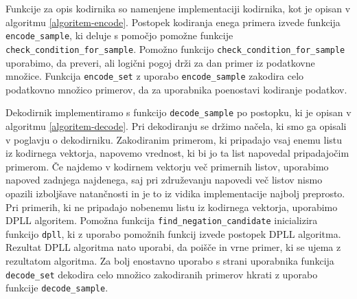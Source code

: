\documentclass[12pt,a4paper,twoside]{article}
\theoremstyle{definition} %
\theoremstyle{plain} %
\numberwithin{equation}{section}  %
\begin{document}
Funkcije za opis kodirnika so namenjene implementaciji kodirnika, kot je opisan v algoritmu \ref{algoritem-encode}.
Postopek kodiranja enega primera izvede funkcija \texttt{encode\_sample}, ki deluje s pomočjo pomožne funkcije \texttt{check\_condition\_for\_sample}.
Pomožno funkcijo \texttt{check\_condition\_for\_sample} uporabimo, da preveri, ali logični pogoj drži za dan primer iz podatkovne množice.
Funkcija \texttt{encode\_set} z uporabo \texttt{encode\_sample} zakodira celo podatkovno množico primerov, da za uporabnika poenostavi kodiranje podatkov.



Dekodirnik implementiramo s funkcijo \texttt{decode\_sample} po postopku, ki je opisan v algoritmu \ref{algoritem-decode}.
Pri dekodiranju se držimo načela, ki smo ga opisali v poglavju o dekodirniku.
Zakodiranim primerom, ki pripadajo vsaj enemu listu iz kodirnega vektorja, napovemo vrednost, ki bi jo ta list napovedal pripadajočim primerom.
Če najdemo v kodirnem vektorju več primernih listov, uporabimo napoved zadnjega najdenega, 
saj pri združevanju napovedi več listov nismo opazili izboljšave natančnosti in je to iz vidika implementacije najbolj preprosto.
Pri primerih, ki ne pripadajo nobenemu listu iz kodirnega vektorja, uporabimo DPLL algoritem. %
Pomožna funkcija \texttt{find\_negation\_candidate} inicializira funkcijo \texttt{dpll}, ki z uporabo pomožnih funkcij izvede postopek DPLL algoritma. %
Rezultat DPLL algoritma nato uporabi, da poišče in vrne primer, ki se ujema z rezultatom algoritma.
Za bolj enostavno uporabo s strani uporabnika funkcija \texttt{decode\_set} dekodira celo množico zakodiranih primerov hkrati z uporabo funkcije \texttt{decode\_sample}.

\end{document}
